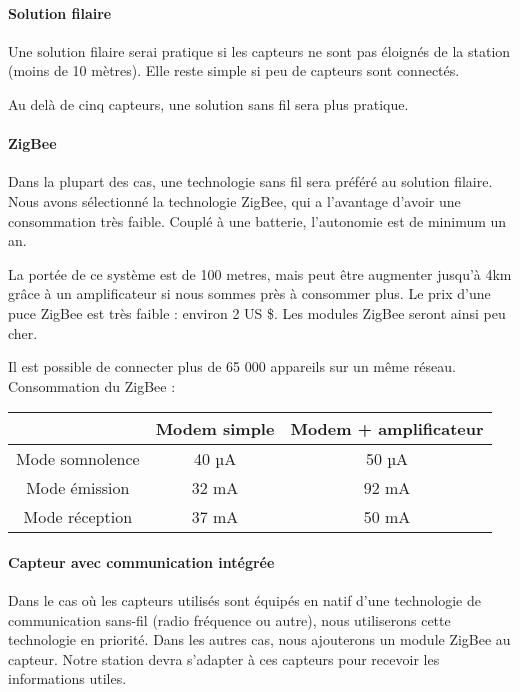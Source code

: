 \paragraph{Solution filaire}

Une solution filaire serai pratique si les capteurs ne sont pas éloignés de la station (moins de 10 mètres). Elle reste simple si peu de capteurs sont connectés.

Au delà de cinq capteurs, une solution sans fil sera plus pratique.\\

\paragraph{ZigBee}

Dans la plupart des cas, une technologie sans fil sera préféré au solution filaire. Nous avons sélectionné la technologie ZigBee, qui a l'avantage d'avoir une consommation très faible. Couplé à une batterie, l'autonomie est de minimum un an. 

La portée de ce système est de 100 metres, mais peut être augmenter jusqu'à 4km grâce à un amplificateur si nous sommes près à consommer plus. Le prix d'une puce ZigBee est très faible : environ 2 US \$. Les modules ZigBee seront ainsi peu cher.

Il est possible de connecter plus de 65 000 appareils sur un même réseau.\\

Consommation du ZigBee :

\begin{center}
\begin{tabular}{|c|c|c|}
\hline  & Modem simple & Modem + amplificateur \\ 
\hline Mode somnolence & 40 µA & 50 µA \\ 
\hline Mode émission & 32 mA  & 92 mA \\ 
\hline Mode réception & 37 mA  & 50 mA \\ 
\hline 
\end{tabular} 
\end{center}

\paragraph{Capteur avec communication intégrée}

Dans le cas où les capteurs utilisés sont équipés en natif d'une technologie de communication sans-fil (radio fréquence ou autre), nous utiliserons cette technologie en priorité. Dans les autres cas, nous ajouterons un module ZigBee au capteur. Notre station devra s'adapter à ces capteurs pour recevoir les informations utiles.

